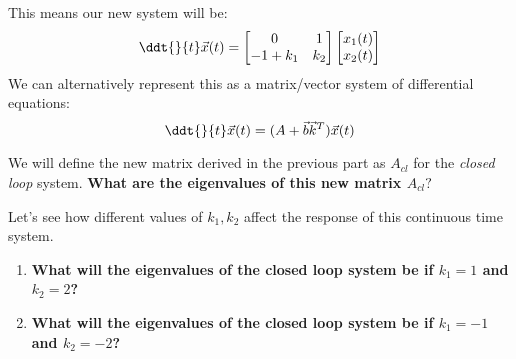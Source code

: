 \begin{enumerate}[resume]
{  This means our new system will be:
  \begin{equation}
    \ddt{}{t} \vec{x}(t) = 
    \begin{bmatrix}
    0 & 1 \\
    -1 + k_1 & k_2
    \end{bmatrix} 
    \begin{bmatrix} x_1(t) \\ x_2(t) \end{bmatrix} 
  \end{equation}
  We can alternatively represent this as a matrix/vector system of differential equations:
  \begin{equation}
    \ddt{}{t} \vec{x}(t) = (A + \vec{b} \vec{k}^T) \vec{x}(t)
  \end{equation}
}

\qitem We will define the new matrix derived in the previous part as $A_{cl}$ for the \textit{closed loop} system. 
\textbf{What are the eigenvalues of this new matrix $A_{cl}?$}

\ws{\vspace{100px}}

\qitem Let's see how different values of $k_1, k_2$ affect the response of this continuous time system.

\begin{enumerate}
\item \textbf{What will the eigenvalues of the closed loop system be if $k_1 = 1$ and $k_2 = 2$?}

\ws{\vspace{75px}}
\item \textbf{What will the eigenvalues of the closed loop system be if $k_1 = -1$ and $k_2 = -2$?}

\ws{\vspace{75px}}
\end{enumerate}


\end{enumerate}
